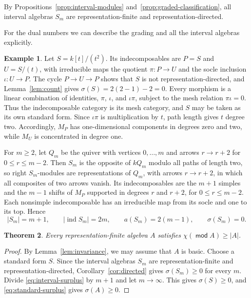 \documentclass[a4paper,reqno,10pt]{amsart}
\newtheorem{theorem}{Theorem}[section]
\theoremstyle{definition}
\newtheorem{example}[theorem]{Example}
\numberwithin{equation}{section}
\DeclareMathOperator{\moduleCategory}{\mathsf{mod}}
\renewcommand{\mod}{\moduleCategory}
\DeclareMathOperator{\ind}{ind}
\begin{document}
By Propositions~\ref{prop:interval-modules}
and~\ref{prop:graded-classification}, all interval algebras \(S_m\) are
representation-finite and representation-directed.

For the dual numbers we can describe the grading and all the interval
algebras explicitly.
\begin{example}\label{ex:dual-numbers}
Let \(S=k[t]/(t^2)\). Its indecomposables are \(P=S\) and \(U=S/(t)\),
with irreducible maps the quotient \(\pi:P\to U\) and the socle inclusion
\(\iota:U\to P\). The cycle \(P\to U\to P\) shows that \(S\) is
not representation-directed, and Lemma~\ref{lem:count} gives
\(\sigma(S)=2(2-1)-2=0\).
Every morphism is a linear combination of identities,
\(\pi\), \(\iota\), and \(\iota\pi\), subject to the mesh relation
\(\pi\iota=0\). Thus the indecomposable category is its mesh category,
and \(S\) may be taken as its own standard form. Since \(\iota\pi\) is
multiplication by \(t\), path length gives \(t\) degree two. Accordingly, \(M_P\) has one-dimensional components in degrees
zero and two, while \(M_U\) is concentrated in degree one.

For \(m\geq2\), let \(Q_m\) be the quiver with vertices
\(0,\ldots,m\) and arrows \(r\to r+2\) for \(0\leq r\leq m-2\). Then
\(S_m\) is the opposite of \(kQ_m\) modulo all paths of length two, so
right \(S_m\)-modules are representations of \(Q_m\), with arrows
\(r\to r+2\), in which all composites of two arrows vanish. Its indecomposables are the \(m+1\)
simples and the \(m-1\) shifts of \(M_P\) supported in degrees \(r\) and
\(r+2\), for \(0\leq r\leq m-2\). Each nonsimple indecomposable has an irreducible map
from its socle and one to its top. Hence
\[
 |S_m|=m+1,\qquad |\ind S_m|=2m,\qquad a(S_m)=2(m-1),
 \qquad\sigma(S_m)=0.
\]
\end{example}
\begin{theorem}\label{thm:lower-bound}
Every representation-finite algebra \(A\) satisfies
\(\chi(\mod A)\geq|A|\).
\end{theorem}
\begin{proof}
By Lemma~\ref{lem:invariance}, we may assume that \(A\) is basic.
Choose a standard form \(S\).
Since the interval algebras \(S_m\) are representation-finite and
representation-directed, Corollary~\ref{cor:directed} gives
\(\sigma(S_m)\geq0\) for every \(m\). Divide
\eqref{eq:interval-surplus} by \(m+1\) and let \(m\to\infty\).
This gives \(\sigma(S)\geq0\), and \eqref{eq:standard-surplus} gives
\(\sigma(A)\geq0\).
\end{proof}
\end{document}
